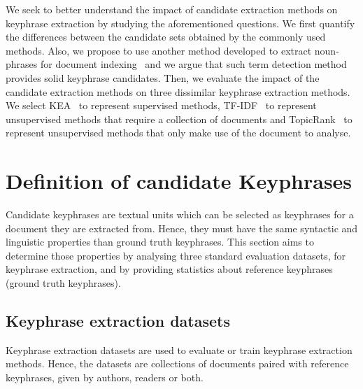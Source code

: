   We seek to better understand the impact of candidate extraction methods on
  keyphrase extraction by studying the aforementioned questions. We first
  quantify the differences between the candidate sets obtained by the commonly
  used methods. Also, we propose to use another method developed to extract
  noun-phrases for document indexing~\cite{evans1996nounphraseanalysis} and we
  argue that such term detection
  method~\cite{castellvi2001automatictermdetection} provides solid keyphrase
  candidates. Then, we evaluate the impact of the candidate extraction methods
  on three dissimilar keyphrase extraction methods. We select
  KEA~\cite{witten1999kea} to represent supervised methods,
  TF-IDF~\cite{jones1972tfidf} to represent unsupervised methods that require a
  collection of documents and TopicRank~\cite{bougouin2013topicrank} to
  represent unsupervised methods that only make use of the document to analyse.


\section{Definition of candidate Keyphrases}
\label{sec:study_of_ground_truth_keyphrases}
  Candidate keyphrases are textual units which can be selected as keyphrases
  for a document they are extracted from. Hence, they must have the same
  syntactic and linguistic properties than ground truth keyphrases. This section
  aims to determine those properties by analysing three standard evaluation
  datasets, for keyphrase extraction, and by providing statistics about
  reference keyphrases (ground truth keyphrases).

  \subsection{Keyphrase extraction datasets}
  \label{subsec:keyphrase_extraction_datasets}
    Keyphrase extraction datasets are used to evaluate or train keyphrase
    extraction methods. Hence, the datasets are collections of documents paired
    with reference keyphrases, given by authors, readers or both.

